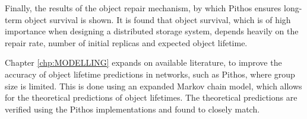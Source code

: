 Finally, the results of the object repair mechanism, by which Pithos ensures long-term object survival is shown. It is found that object survival, which is of high importance when designing a distributed storage system, depends heavily on the repair rate, number of initial replicas and expected object lifetime.

Chapter \ref{chp:MODELLING} expands on available literature, to improve the accuracy of object lifetime predictions in networks, such as Pithos, where group size is limited. This is done using an expanded Markov chain model, which allows for the theoretical predictions of object lifetimes. The theoretical predictions are verified using the Pithos implementations and found to closely match.
